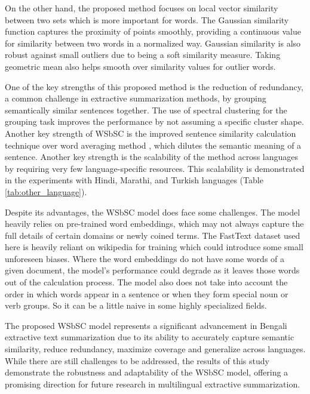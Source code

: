 \documentclass[acmlarge]{acmart}
\begin{document}
On the other hand, the proposed method focuses on local vector similarity between two sets which is more important for words. The Gaussian similarity function captures the proximity of points smoothly, providing a continuous value for similarity between two words in a normalized way. Gaussian similarity is also robust against small outliers due to being a soft similarity measure. Taking geometric mean also helps smooth over similarity values for outlier words.

One of the key strengths of this proposed method is the reduction of redundancy, a common challenge in extractive summarization methods, by grouping semantically similar sentences together. The use of spectral clustering for the grouping task improves the performance by not assuming a specific cluster shape. Another key strength of WSbSC is the improved sentence similarity calculation technique over word averaging method \cite{roychowdhury-etal-2022-spectral-base}, which dilutes the semantic meaning of a sentence. Another key strength is the scalability of the method across languages by requiring very few language-specific resources. This scalability is demonstrated in the experiments with Hindi, Marathi, and Turkish languages (Table \ref{tab:other_language}).

Despite its advantages, the WSbSC model does face some challenges. The model heavily relies on pre-trained word embeddings, which may not always capture the full details of certain domains or newly coined terms. The FastText \cite{grave-etal-2018-fasttext} dataset used here is heavily reliant on wikipedia for training which could introduce some small unforeseen biases. Where the word embeddings do not have some words of a given document, the model’s performance could degrade as it leaves those words out of the calculation process. The model also does not take into account the order in which words appear in a sentence or when they form special noun or verb groups. So it can be a little naive in some highly specialized fields.

The proposed WSbSC model represents a significant advancement in Bengali extractive text summarization due to its ability to accurately capture semantic similarity, reduce redundancy, maximize coverage and generalize across languages. While there are still challenges to be addressed, the results of this study demonstrate the robustness and adaptability of the WSbSC model, offering a promising direction for future research in multilingual extractive summarization.
\end{document}

